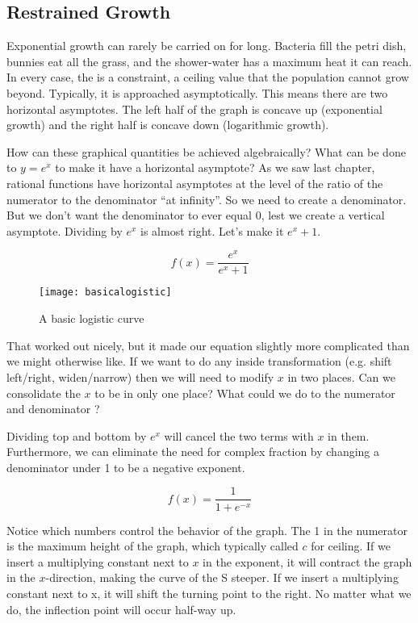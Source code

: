 
\subsection{Restrained Growth}



Exponential growth can rarely be carried on for long.  Bacteria fill the petri dish, 
bunnies eat all the grass, and the shower-water has a maximum heat it can 
reach.  In every case, the is a constraint, a ceiling value that the population 
cannot grow beyond.  Typically, it is approached asymptotically.  This means there are
two horizontal asymptotes.  The left half of the graph is concave up (exponential
growth) and the right half is concave down (logarithmic growth).  

How can these graphical quantities be achieved algebraically?  What can 
be done to $y=e^x$ to make it have a horizontal asymptote?  As we saw last
chapter, rational functions have horizontal asymptotes at the level of the ratio
of the numerator to the denominator ``at infinity''.  So we need to create a 
denominator.  But we don't want the denominator to ever equal 0, lest we
create a vertical asymptote.  Dividing by $e^x$ is almost right.  Let's make it
$e^x+1$.

$$
f(x) = \frac{e^x}{e^x+1}
$$

\begin{figure}[h]
\begin{centering}
\texttt{[image: basicalogistic]}
\caption{A basic logistic curve}
\end{centering}
\end{figure}

That worked out nicely, but it made our equation slightly more complicated
than we might otherwise like.  If we want to do any inside transformation (e.g.
shift left/right, widen/narrow) then we will need to modify $x$ in two places.  Can
we consolidate the $x$ to be in only one place?  What could we do to the
numerator and denominator ?

Dividing top and bottom by $e^x$ will cancel the two terms with $x$ in them.
Furthermore, we can eliminate the need for complex fraction by changing
a denominator under 1 to be a negative exponent.

$$
f(x) = \frac{1}{1+e^{-x}}
$$

Notice which numbers control the behavior of the graph.  The 1 in the numerator
is the maximum height of the graph, which typically called $c$ for ceiling. If we
insert a multiplying constant next to $x$ in the exponent, it will contract the
graph in the $x$-direction, making the curve of the S steeper.  If we insert
a multiplying constant next to x, it will shift the turning point to the right.  No
matter what we do, the inflection point will occur half-way up.

